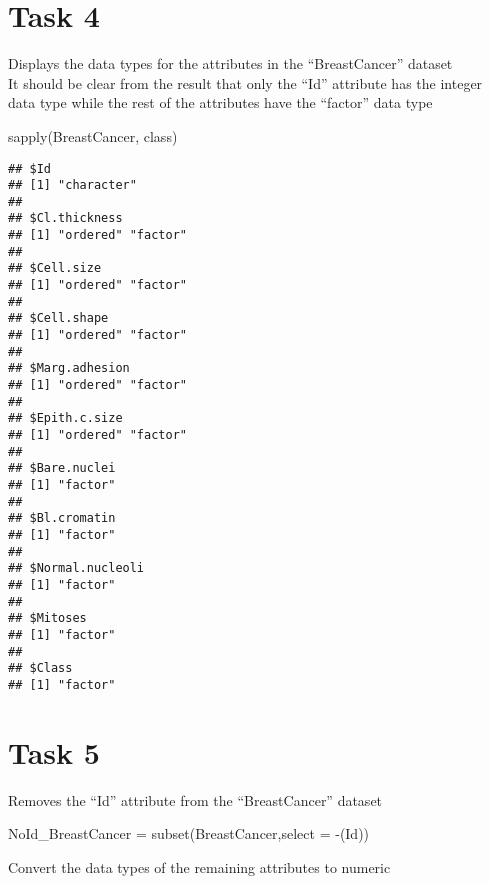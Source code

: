 \documentclass[
]{article}
\newenvironment{Shaded}{\begin{snugshade}}{\end{snugshade}}
\newcommand{\AttributeTok}[1]{\textcolor[rgb]{0.77,0.63,0.00}{#1}}
\newcommand{\FunctionTok}[1]{\textcolor[rgb]{0.00,0.00,0.00}{#1}}
\newcommand{\NormalTok}[1]{#1}
\newcommand{\OtherTok}[1]{\textcolor[rgb]{0.56,0.35,0.01}{#1}}
\newcommand{\SpecialCharTok}[1]{\textcolor[rgb]{0.00,0.00,0.00}{#1}}
\begin{document}
\hypertarget{task-4}{%
\section{Task 4}\label{task-4}}

Displays the data types for the attributes in the ``BreastCancer''
dataset\\
It should be clear from the result that only the ``Id'' attribute has
the integer data type while the rest of the attributes have the
``factor'' data type

\begin{Shaded}
\begin{Highlighting}[]
\FunctionTok{sapply}\NormalTok{(BreastCancer, class)}
\end{Highlighting}
\end{Shaded}

\begin{verbatim}
## $Id
## [1] "character"
## 
## $Cl.thickness
## [1] "ordered" "factor" 
## 
## $Cell.size
## [1] "ordered" "factor" 
## 
## $Cell.shape
## [1] "ordered" "factor" 
## 
## $Marg.adhesion
## [1] "ordered" "factor" 
## 
## $Epith.c.size
## [1] "ordered" "factor" 
## 
## $Bare.nuclei
## [1] "factor"
## 
## $Bl.cromatin
## [1] "factor"
## 
## $Normal.nucleoli
## [1] "factor"
## 
## $Mitoses
## [1] "factor"
## 
## $Class
## [1] "factor"
\end{verbatim}

\hypertarget{task-5}{%
\section{Task 5}\label{task-5}}

Removes the ``Id'' attribute from the ``BreastCancer'' dataset

\begin{Shaded}
\begin{Highlighting}[]
\NormalTok{NoId\_BreastCancer }\OtherTok{=} \FunctionTok{subset}\NormalTok{(BreastCancer,}\AttributeTok{select =} \SpecialCharTok{{-}}\NormalTok{(Id))}
\end{Highlighting}
\end{Shaded}

Convert the data types of the remaining attributes to numeric\\
\end{document}
